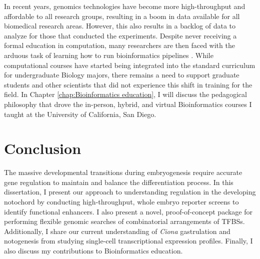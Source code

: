 \begin{dissertationintroduction}
    In recent years, genomics technologies have become more high-throughput and affordable to all research groups, resulting in a boom in data available for all biomedical research areas. However, this also results in a backlog of data to analyze for those that conducted the experiments. Despite never receiving a formal education in computation, many researchers are then faced with the arduous task of learning how to run bioinformatics pipelines \cite{barone2017, stephens2015}. While computational courses have started being integrated into the standard curriculum for undergraduate Biology majors, there remains a need to support graduate students and other scientists that did not experience this shift in training for the field. In Chapter \ref{chap:Bioinformatics education}, I will discuss the pedagogical philosophy that drove the in-person, hybrid, and virtual Bioinformatics courses I taught at the University of California, San Diego. 

    \section{Conclusion}

    The massive developmental transitions during embryogenesis require accurate gene regulation to maintain and balance the differentiation process. In this dissertation, I present our approach to understanding regulation in the developing notochord by conducting high-throughput, whole embryo reporter screens to identify functional enhancers. I also present a novel, proof-of-concept package for performing flexible genomic searches of combinatorial arrangements of TFBSs. Additionally, I share our current understanding of \textit{Ciona} gastrulation and notogenesis from studying single-cell transcriptional expression profiles. Finally, I also discuss my contributions to Bioinformatics education.
    
\end{dissertationintroduction}
